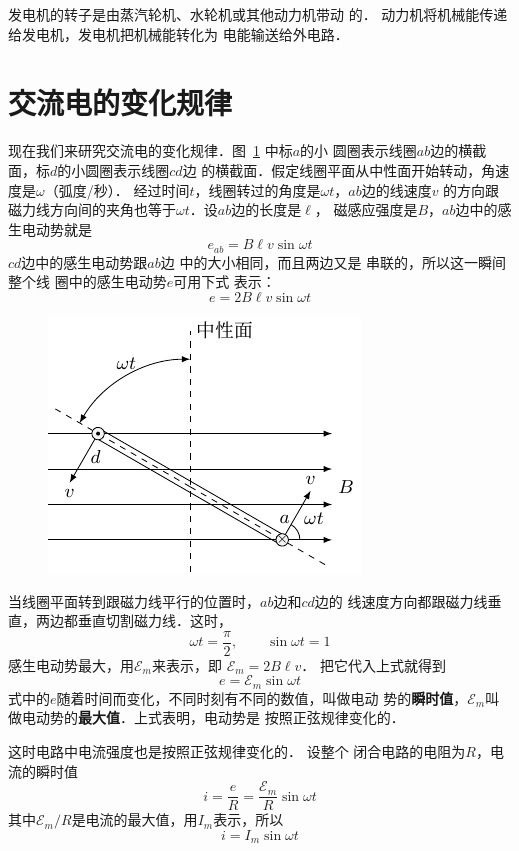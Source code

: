 发电机的转子是由蒸汽轮机、水轮机或其他动力机带动
的．
动力机将机械能传递给发电机，发电机把机械能转化为
电能输送给外电路．

\section{交流电的变化规律}



现在我们来研究交流电的变化规律．图~\ref{fig_C_3-2} 中标$a$的小
圆圈表示线圈$ab$边的横截面，标$d$的小圆圈表示线圈$cd$边
的横截面．假定线圈平面从中性面开始转动，角速度是$\omega$（弧度/秒）．
经过时间$t$，线圈转过的角度是$\omega t$，$ab$边的线速度$v$
的方向跟磁力线方向间的夹角也等于$\omega t$．设$ab$边的长度是$\ell$，
磁感应强度是$B$，$ab$边中的感
生电动势就是
\[e_{ab}=B\ell v\sin \omega t\]
$cd$边中的感生电动势跟$ab$边
中的大小相同，而且两边又是
串联的，所以这一瞬间整个线
圈中的感生电动势$e$可用下式
表示：
\[e=2B\ell v\sin \omega t\]


\begin{figure}[htbp]
	\centering
	\includegraphics{fig/C/3-2.pdf}
	\caption{}\label{fig_C_3-2}
\end{figure}

当线圈平面转到跟磁力线平行的位置时，$ab$边和$cd$边的
线速度方向都跟磁力线垂直，两边都垂直切割磁力线．这时，
\[\omega t=\frac{\pi}{2},\qquad \sin \omega t=1 \]
感生电动势最大，用$\mathcal{E}_m$来表示，即
$\mathcal{E}_m=2B\ell v$．
把它代入上式就得到
\begin{equation}\label{eq_C_3-1}
    e=\mathcal{E}_m \sin\omega t
\end{equation}
式中的$e$随着时间而变化，不同时刻有不同的数值，叫做电动
势的\textbf{瞬时值}，$\mathcal{E}_m$叫做电动势的\textbf{最大值}．上式表明，电动势是
按照正弦规律变化的．

这时电路中电流强度也是按照正弦规律变化的．
设整个
闭合电路的电阻为$R$，电流的瞬时值
\[i=\frac{e}{R}=\frac{\mathcal{E}_m}{R} \sin\omega t \]
其中$\mathcal{E}_m/R$是电流的最大值，用$I_m$表示，所以
\begin{equation}\label{eq_C_3-2}
    i=I_m \sin\omega t
\end{equation}

